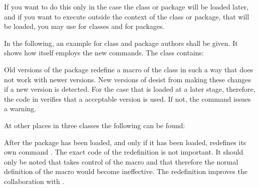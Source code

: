 If you
want to do this only in the case the class or package will be loaded later,
and if you want to execute  outside the context of the
class or package, that will be loaded, you may use
 for classes and
 for packages.

\begin{Example}
  In the following, an example for class and package authors shall be
  given.  It shows how {\KOMAScript} itself employs the new commands.
  The class  contains:
\begin{lstcode}
\end{lstcode}
  Old versions of the  package redefine a macro of the
   class in such a way that does not work with newer
  {\KOMAScript} versions.  New versions of  desist
  from making these changes if a new {\KOMAScript} version is detected.
  For the case that  is loaded at a later stage,
  therefore, the code in  verifies that a acceptable
   version is used.  If not, the command issues a
  warning.

  At other places in three {\KOMAScript} classes the following can be
  found:
\begin{lstcode}
  \AfterPackage{caption2}{%
    \renewcommand*{\setcapindent}{%
\end{lstcode}
  After the package  has been loaded, and only if it
  has been loaded, {\KOMAScript} redefines its own command
  .  The exact code of the redefinition is not
  important.  It should only be noted that  takes
  control of the  macro and that therefore the normal
  definition of the  macro would become ineffective.
  The redefinition improves the collaboration with .


\end{Example}
